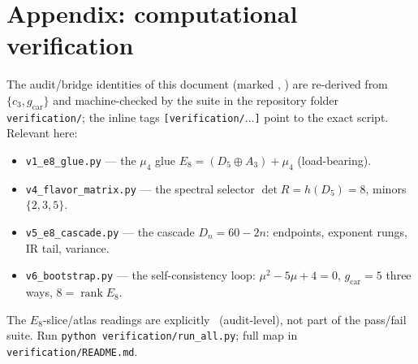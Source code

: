 \documentclass[11pt,a4paper]{article}
\newcommand{\gcar}{g_{\mathrm{car}}}
\newcommand{\cthree}{c_3}
\theoremstyle{definition}
\begin{document}
\section*{Appendix: computational verification}
The audit/bridge identities of this document (marked \mE, \mE) are re-derived from $\{\cthree,\gcar\}$ and
machine-checked by the suite in the repository folder \texttt{verification/}; the inline tags
\texttt{[verification/$\dots$]} point to the exact script. Relevant here:
\begin{itemize}[leftmargin=1.4em,itemsep=1pt]
\item \texttt{v1\_e8\_glue.py} --- the $\mu_4$ glue $E_8{=}(D_5{\oplus}A_3){+}\mu_4$ (load-bearing).
\item \texttt{v4\_flavor\_matrix.py} --- the spectral selector $\det R{=}h(D_5){=}8$, minors $\{2,3,5\}$.
\item \texttt{v5\_e8\_cascade.py} --- the cascade $D_n{=}60{-}2n$: endpoints, exponent rungs, IR tail, variance.
\item \texttt{v6\_bootstrap.py} --- the self-consistency loop: $\mu^2{-}5\mu{+}4{=}0$, $\gcar{=}5$ three ways, $8{=}\operatorname{rank}E_8$.
\end{itemize}
The $E_8$-slice/atlas readings are explicitly \mO\ (audit-level), not part of the pass/fail suite. Run
\texttt{python verification/run\_all.py}; full map in \texttt{verification/README.md}.
\end{document}
